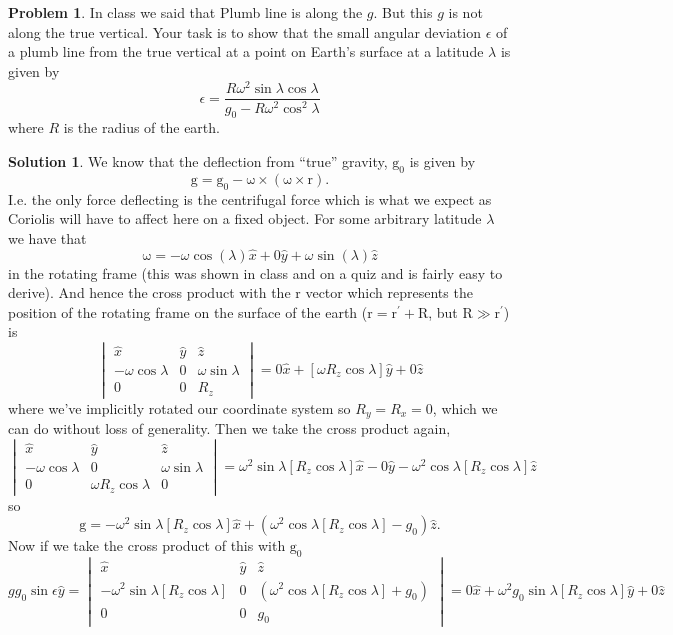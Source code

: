\documentclass[10pt]{article}
\theoremstyle{definition}
\newtheorem{problem}{Problem}
\newtheorem{soln}{Solution}
\newcommand{\ux}{\hat{x}}
\newcommand{\uy}{\hat{y}}
\newcommand{\uz}{\hat{z}}
\newcommand{\pr}[1]{{#1}^\prime}
\newcommand{\bv}[1]{\bm{\mathrm{#1}}}
\begin{document}
\begin{problem}
In class we said that Plumb line is along the $g$. But this $g$ is not along the true vertical.
Your task is to show that the small angular deviation $\epsilon$ of a plumb line from the true vertical at a
point on Earth's surface at a latitude $\lambda$ is given by
$$\epsilon=\frac{R\omega^2\sin\lambda\cos\lambda}{g_0-R\omega^2\cos^2\lambda}$$
where $R$ is the radius of the earth.
\end{problem}
\begin{soln}
  We know that the deflection from ``true'' gravity, $\bv{g}_0$ is given by
  $$\bv{g}=\bv{g}_0-\bv{\omega}\times\left(\bv{\omega}\times \bv{r}\right).$$
  I.e. the only force deflecting is the centrifugal force which is what we expect as Coriolis will have to affect here on a fixed object.
  For some arbitrary latitude $\lambda$ we have that
  $$\bv{\omega}=-\omega\cos(\lambda)\ux+0\uy+\omega\sin(\lambda)\uz$$
  in the rotating frame (this was shown in class and on a quiz and is fairly easy to derive).
  And hence the cross product with the $\bv{r}$ vector which represents the position of the rotating frame on the surface of the earth ($\bv{r}=\pr{\bv{r}}
    +\bv{R}$, but $\bv{R}\gg \pr{\bv{r}}$) is
  $$\begin{vmatrix}
      \ux                & \uy & \uz               \\
      -\omega\cos\lambda & 0   & \omega\sin\lambda \\
      0                  & 0   & R_z
    \end{vmatrix}=0\ux+\left[\omega R_z\cos\lambda \right]\uy+0\uz
  $$
  where we've implicitly rotated our coordinate system so $R_y=R_x=0$, which we can do without loss of generality.
  Then we take the cross product again,
  $$
    \begin{vmatrix}
      \ux                & \uy                   & \uz               \\
      -\omega\cos\lambda & 0                     & \omega\sin\lambda \\
      0                  & \omega R_z\cos\lambda & 0
    \end{vmatrix}=\omega^2\sin\lambda\left[ R_z\cos\lambda\right]\ux
    -0\uy-\omega^2\cos\lambda\left[ R_z\cos\lambda\right]\uz
  $$
  so
  $$\bv{g}=-\omega^2\sin\lambda\left[ R_z\cos\lambda\right]\ux
    +\left(\omega^2\cos\lambda\left[ R_z\cos\lambda\right]-g_0\right)\uz.$$
  Now if we take the cross product of this with $\bv{g}_0$
  \begin{equation}
    gg_0\sin\epsilon\uy=
    \begin{vmatrix}
      \ux                                              & \uy & \uz                                                              \\
      -\omega^2\sin\lambda\left[ R_z\cos\lambda\right] & 0   & \left(\omega^2\cos\lambda\left[ R_z\cos\lambda\right]+g_0\right) \\
      0                                                & 0   & g_0
    \end{vmatrix}=0\ux+\omega^2g_0\sin\lambda\left[ R_z\cos\lambda\right]\uy+0\uz
  \end{equation}


\end{soln}
\end{document}
